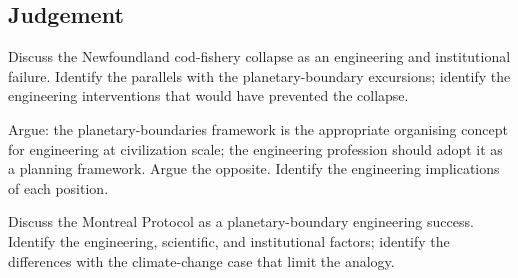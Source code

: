 \subsection*{Judgement}

\begin{exercise}
Discuss the Newfoundland cod-fishery collapse as an engineering and institutional failure. Identify the parallels with the planetary-boundary excursions; identify the engineering interventions that would have prevented the collapse.
\end{exercise}

\begin{exercise}
Argue: the planetary-boundaries framework is the appropriate organising concept for engineering at civilization scale; the engineering profession should adopt it as a planning framework. Argue the opposite. Identify the engineering implications of each position.
\end{exercise}

\begin{exercise}
Discuss the Montreal Protocol as a planetary-boundary engineering success. Identify the engineering, scientific, and institutional factors; identify the differences with the climate-change case that limit the analogy.
\end{exercise}
